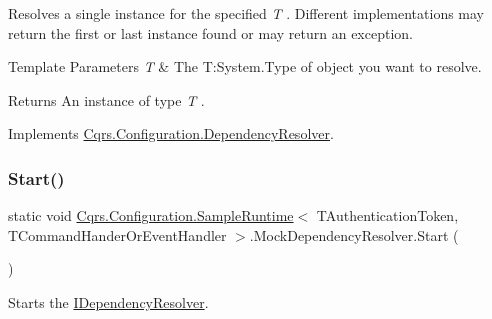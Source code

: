 Resolves a single instance for the specified {\itshape T} . Different implementations may return the first or last instance found or may return an exception. 


\begin{DoxyTemplParams}{Template Parameters}
{\em T} & The T\+:\+System.\+Type of object you want to resolve.\\
\hline
\end{DoxyTemplParams}
\begin{DoxyReturn}{Returns}
An instance of type {\itshape T} . 
\end{DoxyReturn}


Implements \hyperlink{classCqrs_1_1Configuration_1_1DependencyResolver_a1eb177fc6c914b45d138642fb6d9454d_a1eb177fc6c914b45d138642fb6d9454d}{Cqrs.\+Configuration.\+Dependency\+Resolver}.

\mbox{\label{classCqrs_1_1Configuration_1_1SampleRuntime_1_1MockDependencyResolver_a01bee8933ae869c67100d92e4b84ba85_a01bee8933ae869c67100d92e4b84ba85}} 
\subsubsection{\texorpdfstring{Start()}{Start()}}
{\footnotesize\ttfamily static void \hyperlink{classCqrs_1_1Configuration_1_1SampleRuntime}{Cqrs.\+Configuration.\+Sample\+Runtime}$<$ T\+Authentication\+Token, T\+Command\+Hander\+Or\+Event\+Handler $>$.Mock\+Dependency\+Resolver.\+Start (\begin{DoxyParamCaption}{ }\end{DoxyParamCaption})\hspace{0.3cm}{\ttfamily [static]}}



Starts the \hyperlink{interfaceCqrs_1_1Configuration_1_1IDependencyResolver}{I\+Dependency\+Resolver}. 

